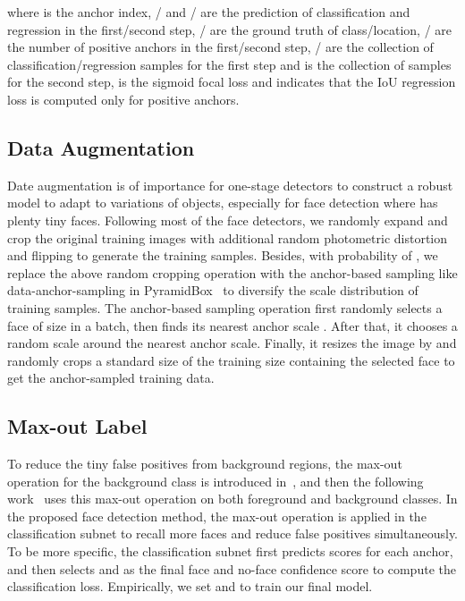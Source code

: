 \documentclass{article} \usepackage{nips13submit_e,times}
\begin{document}
where  is the anchor index, / and / are the prediction of classification and regression in the first/second step, / are the ground truth of class/location, / are the number of positive anchors in the first/second step, / are the collection of classification/regression samples for the first step and  is the collection of samples for the second step,  is the sigmoid focal loss and  indicates that the IoU regression loss is computed only for positive anchors.

\subsection{Data Augmentation}
Date augmentation is of importance for one-stage detectors to construct a robust model to adapt to variations of objects, especially for face detection where has plenty tiny faces. Following most of the face detectors, we randomly expand and crop the original training images with additional random photometric distortion~\cite{DBLP:journals/corr/Howard13} and flipping to generate the training samples. Besides, with probability of , we replace the above random cropping operation with the anchor-based sampling like data-anchor-sampling in PyramidBox~\cite{tang2018pyramidbox} to diversify the scale distribution of training samples. The anchor-based sampling operation first randomly selects a face of size  in a batch, then finds its nearest anchor scale . After that, it chooses a random scale  around the nearest anchor scale. Finally, it resizes the image by  and randomly crops a standard size of the training size containing the selected face to get the anchor-sampled training data.

\subsection{Max-out Label}
To reduce the tiny false positives from background regions, the max-out operation for the background class is introduced in~\cite{DBLP:conf/iccv/abs-1708-05237}, and then the following work~\cite{tang2018pyramidbox} uses this max-out operation on both foreground and background classes. In the proposed face detection method, the max-out operation is applied in the classification subnet to recall more faces and reduce false positives simultaneously. To be more specific, the classification subnet first predicts  scores for each anchor, and then selects  and  as the final face and no-face confidence score to compute the classification loss. Empirically, we set  and  to train our final model.
\end{document}
